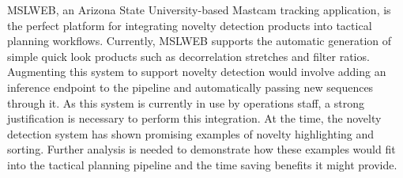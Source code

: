 MSLWEB, an Arizona State University-based Mastcam tracking application, is the perfect platform for integrating novelty detection products into tactical planning workflows. 
Currently, MSLWEB supports the automatic generation of simple quick look products such as decorrelation stretches and filter ratios. 
Augmenting this system to support novelty detection would involve adding an inference endpoint to the pipeline and automatically passing new sequences through it. 
As this system is currently in use by operations staff, a strong justification is necessary to perform this integration. 
At the time, the novelty detection system has shown promising examples of novelty highlighting and sorting. 
Further analysis is needed to demonstrate how these examples would fit into the tactical planning pipeline and the time saving benefits it might provide.